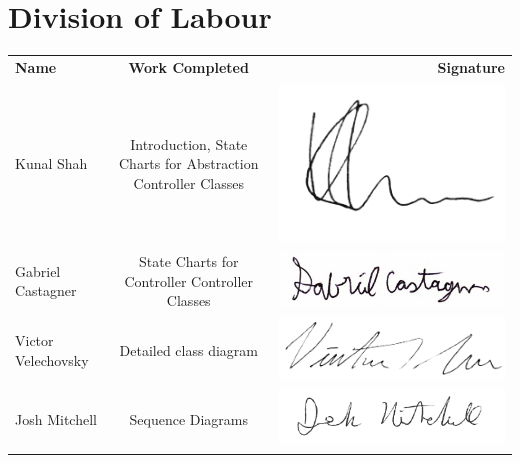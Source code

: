 \documentclass[]{article}
\begin{document}
\newpage

\appendix
\section{Division of Labour}
\label{sec:division_of_labour}
\begin{tabular}{l c r}
	\textbf{Name} & \textbf{Work Completed} & \textbf{Signature} \\
	
	Kunal Shah & Introduction, State Charts for Abstraction Controller Classes  & 
	\includegraphics[scale=0.2]{../Resources/Signature/Kunal-Sig.png} \\
	
	Gabriel Castagner & State Charts for Controller Controller Classes &
	\includegraphics[scale=0.2]{../Resources/Signature/Gabe-Sig.png} \\
	
	Victor Velechovsky & Detailed class diagram & 
	\includegraphics[scale=0.3]{../Resources/Signature/Vic-Sig.png} \\
	
	Josh Mitchell & Sequence Diagrams & 
	\includegraphics[scale=0.2]{../Resources/Signature/Josh-Sig.png} \\
\end{tabular}
\end{document}
